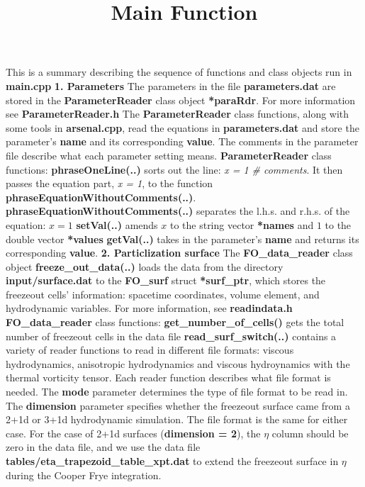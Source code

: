 \documentclass[10.5pt,aps,prd,superscriptaddress]{revtex4}
\newcommand{\n}{\newline}
\newcommand{\nn}{\newline\newline}
\newcommand{\boldf}{\textbf}
\begin{document}
\title{Main Function}
\maketitle 
This is a summary describing the sequence of functions and class objects run in \boldf{main.cpp}
\nn
\boldf{1. Parameters}
\nn
The parameters in the file \boldf{parameters.dat} are stored in the \boldf{ParameterReader} class object \boldf{*paraRdr}. For more information see \boldf{ParameterReader.h}
\nn
The \boldf{ParameterReader} class functions, along with some tools in \boldf{arsenal.cpp}, read the equations in \boldf{parameters.dat} and store the parameter's \boldf{name} and its corresponding \boldf{value}. The comments in the parameter file describe what each parameter setting means. 
\nn\n
\boldf{ParameterReader} class functions:
\nn
\boldf{phraseOneLine(..)} sorts out the line: \textit{x = 1}  \textit{\# comments}. It then passes the equation part, \textit{x = 1}, to the function \boldf{phraseEquationWithoutComments(..)}.
\nn
\boldf{phraseEquationWithoutComments(..)} separates the l.h.s. and r.h.s. of the equation: $x = 1$
\nn
\boldf{setVal(..)} amends $x$ to the string vector \boldf{*names} and $1$ to the double vector \boldf{*values}
\nn
\boldf{getVal(..)} takes in the parameter's \boldf{name} and returns its corresponding \boldf{value}. 
\nn
\nn
\boldf{2. Particlization surface}
\nn
The \boldf{FO\_data\_reader} class object \boldf{freeze\_out\_data(..)} loads the data from the directory \boldf{input/surface.dat} to the \boldf{FO\_surf} struct \boldf{*surf\_ptr}, which stores the freezeout cells' information: spacetime coordinates, volume element, and hydrodynamic variables. For more information, see \boldf{readindata.h}
\nn\n
\boldf{FO\_data\_reader} class functions:
\nn
\boldf{get\_number\_of\_cells()} gets the total number of freezeout cells in the data file
\nn
\boldf{read\_surf\_switch(..)} contains a variety of reader functions to read in different file formats: viscous hydrodynamics, anisotropic hydrodynamics and viscous hydroynamics with the thermal vorticity tensor. Each reader function describes what file format is needed. The \boldf{mode} parameter determines the type of file format to be read in. 
\nn
The \boldf{dimension} parameter specifies whether the freezeout surface came from a 2+1d or 3+1d hydrodynamic simulation. The file format is the same for either case. For the case of 2+1d surfaces (\boldf{dimension = 2}), the $\eta$ column should be zero in the data file, and we use the data file \boldf{tables/eta\_trapezoid\_table\_xpt.dat} to extend the freezeout surface in $\eta$ during the Cooper Frye integration. 
\end{document}
